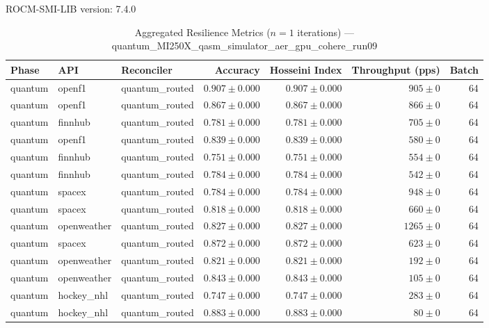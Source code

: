 ROCM-SMI-LIB version: 7.4.0

\begin{table}[htbp]
\caption{Aggregated Resilience Metrics ($n=1$ iterations) --- quantum_MI250X_qasm_simulator_aer_gpu_cohere_run09}
\begin{tabular}{l l l r r r r}
\hline
Phase & API & Reconciler & Accuracy & Hosseini Index & Throughput (pps) & Batch \\
\hline
quantum & openf1 & quantum\_routed & $0.907\pm0.000$ & $0.907\pm0.000$ & $905\pm0$ & 64 \\
quantum & openf1 & quantum\_routed & $0.867\pm0.000$ & $0.867\pm0.000$ & $866\pm0$ & 64 \\
quantum & finnhub & quantum\_routed & $0.781\pm0.000$ & $0.781\pm0.000$ & $705\pm0$ & 64 \\
quantum & openf1 & quantum\_routed & $0.839\pm0.000$ & $0.839\pm0.000$ & $580\pm0$ & 64 \\
quantum & finnhub & quantum\_routed & $0.751\pm0.000$ & $0.751\pm0.000$ & $554\pm0$ & 64 \\
quantum & finnhub & quantum\_routed & $0.784\pm0.000$ & $0.784\pm0.000$ & $542\pm0$ & 64 \\
quantum & spacex & quantum\_routed & $0.784\pm0.000$ & $0.784\pm0.000$ & $948\pm0$ & 64 \\
quantum & spacex & quantum\_routed & $0.818\pm0.000$ & $0.818\pm0.000$ & $660\pm0$ & 64 \\
quantum & openweather & quantum\_routed & $0.827\pm0.000$ & $0.827\pm0.000$ & $1265\pm0$ & 64 \\
quantum & spacex & quantum\_routed & $0.872\pm0.000$ & $0.872\pm0.000$ & $623\pm0$ & 64 \\
quantum & openweather & quantum\_routed & $0.821\pm0.000$ & $0.821\pm0.000$ & $192\pm0$ & 64 \\
quantum & openweather & quantum\_routed & $0.843\pm0.000$ & $0.843\pm0.000$ & $105\pm0$ & 64 \\
quantum & hockey\_nhl & quantum\_routed & $0.747\pm0.000$ & $0.747\pm0.000$ & $283\pm0$ & 64 \\
quantum & hockey\_nhl & quantum\_routed & $0.883\pm0.000$ & $0.883\pm0.000$ & $80\pm0$ & 64 \\

\end{tabular}
\end{table}
